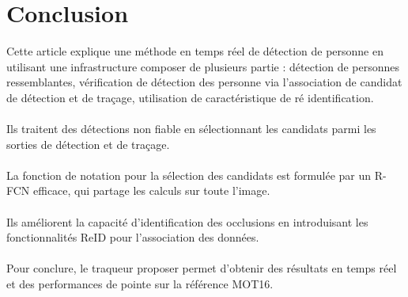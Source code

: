\documentclass[11pt]{report}
\begin{document}
\section{Conclusion}
Cette article explique une méthode en temps réel de détection de personne en utilisant une infrastructure composer de plusieurs partie : détection de personnes ressemblantes, vérification de détection des personne via l'association de candidat de détection et de traçage, utilisation de caractéristique de ré identification. \\\\
Ils traitent des détections non fiable en sélectionnant les candidats parmi les sorties de détection et de traçage. \\\\
La fonction de notation pour la sélection des candidats est formulée par un R-FCN efficace, qui partage les calculs sur toute l'image. \\\\
Ils améliorent la capacité d'identification des occlusions en introduisant les fonctionnalités ReID pour l'association des données. \\\\
Pour conclure, le traqueur proposer permet d'obtenir des résultats en temps réel et des performances de pointe sur la référence MOT16.
\end{document}
